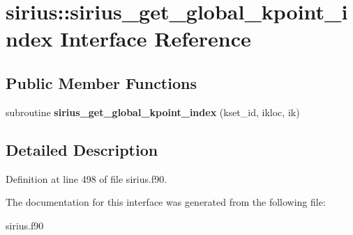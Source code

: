 \hypertarget{interfacesirius_1_1sirius__get__global__kpoint__index}{}\section{sirius\+:\+:sirius\+\_\+get\+\_\+global\+\_\+kpoint\+\_\+index Interface Reference}
\label{interfacesirius_1_1sirius__get__global__kpoint__index}
\subsection*{Public Member Functions}
\begin{DoxyCompactItemize}
\item 
\hypertarget{interfacesirius_1_1sirius__get__global__kpoint__index_ace744f77e33112e14592356dd07d77df}{}subroutine {\bfseries sirius\+\_\+get\+\_\+global\+\_\+kpoint\+\_\+index} (kset\+\_\+id, ikloc, ik)\label{interfacesirius_1_1sirius__get__global__kpoint__index_ace744f77e33112e14592356dd07d77df}

\end{DoxyCompactItemize}


\subsection{Detailed Description}


Definition at line 498 of file sirius.\+f90.



The documentation for this interface was generated from the following file\+:\begin{DoxyCompactItemize}
\item 
sirius.\+f90\end{DoxyCompactItemize}

